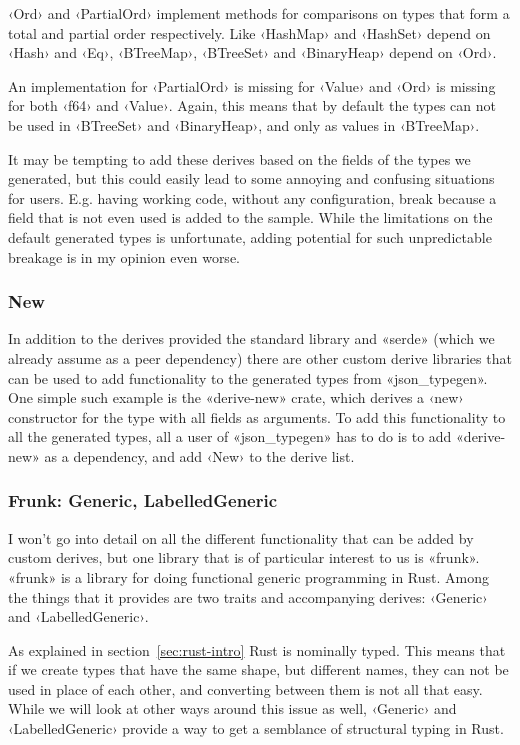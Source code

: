 ‹Ord› and ‹PartialOrd› implement methods for comparisons on types that form a total and partial order respectively. Like ‹HashMap› and ‹HashSet› depend on ‹Hash› and ‹Eq›, ‹BTreeMap›, ‹BTreeSet› and ‹BinaryHeap› depend on ‹Ord›.

An implementation for ‹PartialOrd› is missing for ‹Value› and ‹Ord› is missing for both ‹f64› and ‹Value›. Again, this means that by default the types can not be used in ‹BTreeSet› and ‹BinaryHeap›, and only as values in ‹BTreeMap›.

It may be tempting to add these derives based on the fields of the types we generated, but this could easily lead to some annoying and confusing situations for users. E.g. having working code, without any configuration, break because a field that is not even used is added to the sample. While the limitations on the default generated types is unfortunate, adding potential for such unpredictable breakage is in my opinion even worse.

\subsubsection{New}

In addition to the derives provided the standard library and «serde»  (which we already assume as a peer dependency) there are other custom derive libraries that can be used to add functionality to the generated types from «json_typegen». One simple such example is the «derive-new» crate, which derives a ‹new› constructor for the type with all fields as arguments. To add this functionality to all the generated types, all a user of «json_typegen» has to do is to add «derive-new» as a dependency, and add ‹New› to the derive list.

\subsubsection{Frunk: Generic, LabelledGeneric}

I won't go into detail on all the different functionality that can be added by custom derives, but one library that is of particular interest to us is «frunk»\cite{frunk}. «frunk» is a library for doing functional generic programming in Rust. Among the things that it provides are two traits and accompanying derives: ‹Generic› and ‹LabelledGeneric›.


As explained in section~\ref{sec:rust-intro} Rust is nominally typed. This means that if we create types that have the same shape, but different names, they can not be used in place of each other, and converting between them is not all that easy. While we will look at other ways around this issue as well, ‹Generic› and ‹LabelledGeneric› provide a way to get a semblance of structural typing in Rust.

